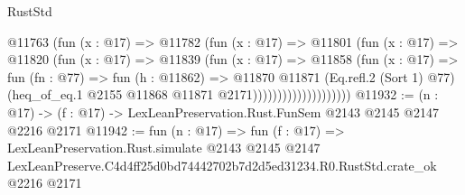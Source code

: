 \begin{lexlean}{RustStd}
\begin{coremodule}
                            @11763
                              (fun (x : @17) =>
                              @11782
                                (fun (x : @17) =>
                                @11801
                                  (fun (x : @17) =>
                                  @11820
                                    (fun (x : @17) =>
                                    @11839
                                      (fun (x : @17) =>
                                      @11858
                                        (fun (x : @17) =>
                                        fun (fn : @77) =>
                                        fun (h : @11862) =>
                                        @11870
                                          @11871
                                          (Eq.refl.{2} (Sort 1) @77)
                                          (heq_of_eq.{1}
                                            @2155
                                            @11868
                                            @11871
                                            @2171))))))))))))))))))))
@11932 := (n : @17) -> (f : @17) -> LexLeanPreservation.Rust.FunSem @2143 @2145 @2147 @2216 @2171
@11942 := fun (n : @17) =>
  fun (f : @17) =>
  LexLeanPreservation.Rust.simulate
    @2143
    @2145
    @2147
    LexLeanPreserve.C4d4ff25d0bd74442702b7d2d5ed31234.R0.RustStd.crate_ok
    @2216
    @2171
\end{coremodule}
\end{lexlean}

